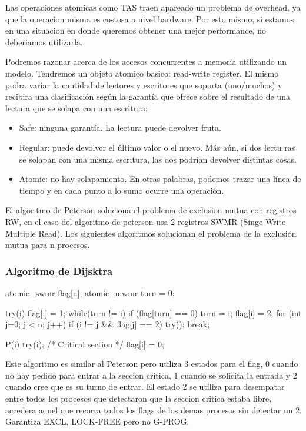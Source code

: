 \documentclass{article}
\begin{document}
Las operaciones atomicas como TAS traen apareado un problema de overhead, ya que la operacion misma es costosa a nivel hardware. Por esto mismo, si estamos en una situacion en donde queremos obtener una mejor performance, no deberiamos utilizarla.

Podremos razonar acerca de los accesos concurrentes a memoria utilizando un modelo. Tendremos un objeto atomico basico: read-write register. El mismo podra variar la cantidad de lectores y escritores que soporta (uno/muchos) y recibira una clasificación según la garantía que ofrece sobre el resultado de una lectura que se solapa con una escritura:

\begin{itemize}
\item Safe: ninguna garantía. La lectura puede devolver fruta.
\item Regular: puede devolver el último valor o el nuevo. Más aún, si dos lectu ras se solapan con una misma escritura, las dos podrían devolver distintas cosas.
\item Atomic: no hay solapamiento. En otras palabras, podemos trazar una línea de tiempo y en cada punto a lo sumo ocurre una operación.
\end{itemize}

El algoritmo de Peterson soluciona el problema de exclusion mutua con registros RW, en el caso del algoritmo de peterson usa 2 registros SWMR (Singe Write Multiple Read). Los siguientes algoritmos solucionan el problema de la exclusión mutua para n procesos.

\subsubsection{Algoritmo de Dijsktra}

\begin{code}
 atomic_swmr flag[n];
 atomic_mwmr turn = 0;
 
 try(i) {
    flag[i] = 1;
    while(turn != i) {
        if (flag[turn] == 0) {
            turn = i;
        }
    }
    flag[i] = 2;
    for (int j=0; j < n; j++) {
        if (i != j && flag[j] == 2) {
            try();
            break;
        }
    }
 }
 
 P(i) {
    try(i);
    /* Critical section */
    flag[i] = 0;
 }
\end{code}

Este algoritmo es similar al Peterson pero utiliza 3 estados para el flag, 0 cuando no hay pedido para entrar a la seccion critica, 1 cuando se solicita la entrada y 2 cuando cree que es su turno de entrar. El estado 2 se utiliza para desempatar entre todos los procesos que detectaron que la seccion critica estaba libre, accedera aquel que recorra todos los flags de los demas procesos sin detectar un 2. Garantiza EXCL, LOCK-FREE pero no G-PROG.
\end{document}
